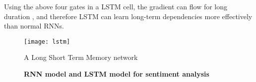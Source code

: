  
  

Using the above four gates in a LSTM cell,  the gradient can flow for long duration , and therefore LSTM can learn long-term dependencies more effectively than normal RNNs. 

\begin{figure}[htb]
	\centering
	\texttt{[image: lstm]}
	\caption{A Long Short Term Memory network}
	\label{fig:lstm}
\end{figure} 

\begin{figure}[ht]
\begin{minipage}[t]{1\linewidth}
\centering 
{} 
\caption{\textbf{RNN model and LSTM model for sentiment analysis}}
\label{fig:songci}
\end{minipage}
\end{figure}



